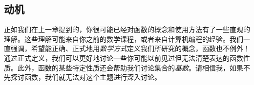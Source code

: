 
\subsection{动机}

正如我们在上一章提到的，你很可能已经对函数的概念和使用方法有了一些直观的理解。这些理解可能来自你之前的数学课程，或者来自计算机编程的经验。我们一直强调，希望能正确、正式地用\emph{数学方式}定义我们所研究的概念，函数也不例外！通过正式定义，我们可以更好地讨论一些你可能以前见过但无法清楚表达的函数性质。此外，函数的某些特定性质还会帮助我们讨论集合的\emph{基数}。请相信我，如果不先探讨函数，我们就无法对这个主题进行深入讨论。
